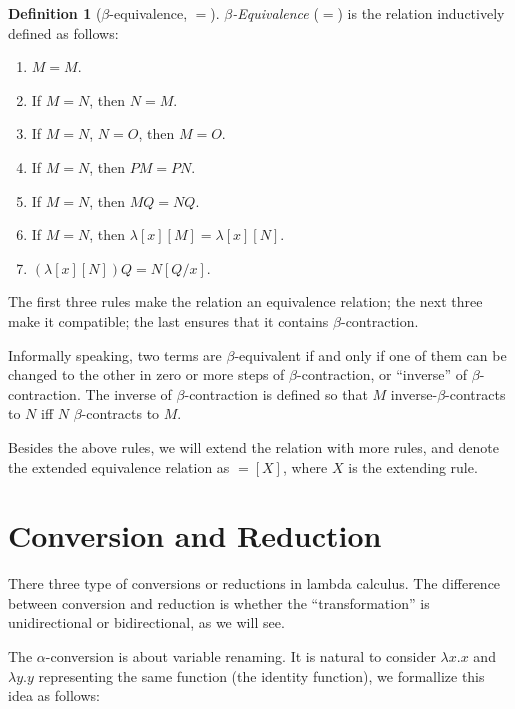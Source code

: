 \documentclass[10pt,a4paper]{article}
\theoremstyle{plain}
\theoremstyle{definition}
\newtheorem{defn}[thm]{Definition}
\theoremstyle{remark}
\newcommand*{\olfileid}[3]{}
\newcommand*{\olsection}[1]{\section*{#1}}
\providecommand{\Subst}[3]{#1[#2/#3]}
\providecommand{\lambd}{\ensuremath{\lambda}}
\begin{document}
\begin{defn}[$\beta$-equivalence, $\equal$]
  \emph{$\beta$-Equivalence} ($\equal$) is the relation inductively
  defined as follows:
  \begin{enumerate}
  \item $M \equal M$.
  \item If $M \equal N$, then $N \equal M$.
  \item If $M \equal N$, $N \equal O$, then $M \equal O$.
  \item If $M \equal N$, then $PM \equal PN$.
  \item If $M \equal N$, then $MQ \equal NQ$.
  \item If $M \equal N$, then $\lambd[x][M] \equal \lambd[x][N]$.
  \item $(\lambd[x][N])Q \equal \Subst{N}{Q}{x}$.
  \end{enumerate}
\end{defn}

The first three rules make the relation an equivalence relation; the
next three make it compatible; the last ensures that it contains
$\beta$-contraction.

Informally speaking, two terms are $\beta$-equivalent if and only if
one of them can be changed to the other in zero or more steps of
$\beta$-contraction, or ``inverse'' of $\beta$-contraction. The inverse of
$\beta$-contraction is defined so that $M$ inverse-$\beta$-contracts to $N$
iff $N$ $\beta$-contracts to $M$.

Besides the above rules, we will extend the relation with more
rules, and denote the extended equivalence relation as $\equal[X]$,
where $X$ is the extending rule.





\olfileid{lam}{int}{con}
\olsection{Conversion and Reduction}

There three type of conversions or reductions in lambda calculus. The
difference between conversion and reduction is whether the
``transformation'' is unidirectional or bidirectional, as we will see.

The $\alpha$-conversion is about variable renaming. It is natural to
consider $\lambda x. x$ and $\lambda y.y$ representing the same
function (the identity function), we formallize this idea as follows:
\end{document}
